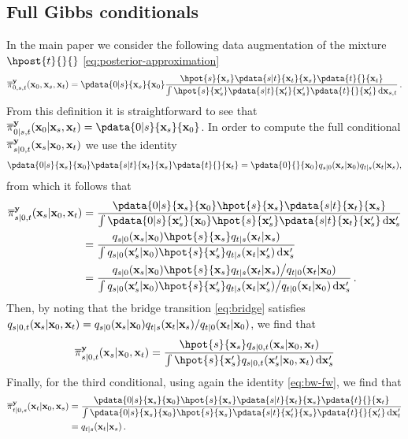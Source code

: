 \subsection{Full Gibbs conditionals}
\label{apdx-sec:conditionals}
In the main paper we consider the following data augmentation of the mixture $\hpost{t}{}{}$ \eqref{eq:posterior-approximation}
\begin{equation}
    \label{eq:extended-distr-normalized}
    \epost{0, s, t}{}{\bx_0, \bx_s, \bx_t} \\ = \pdata{0|s}{\bx_s}{\bx_0} \frac{\hpot{s}{\bx_s} \pdata{s|t}{\bx_t}{\bx_s} \pdata{t}{}{\bx_t}}{\int  \hpot{s}{\bx^\prime _s} \pdata{s|t}{\bx^\prime _t}{\bx^\prime _s} \pdata{t}{}{\bx^\prime _t} \, \rmd \bx_{s, t}}  \eqsp.
\end{equation}
From this definition it is straightforward to see that $\epost{0|s, t}{\bx_s, \bx_t}{\bx_0} = \pdata{0|s}{\bx_s}{\bx_0}$. In order to compute the full conditional $\epost{s|0, t}{\bx_0, \bx_t}{\bx_s}$ we use the identity 
\begin{equation} 
    \label{eq:bw-fw}
    \pdata{0|s}{\bx_s}{\bx_0} \pdata{s|t}{\bx_t}{\bx_s} \pdata{t}{}{\bx_t}= \pdata{0}{}{\bx_0} \fw{s|0}{\bx_0}{\bx_s} \fw{t|s}{\bx_s}{\bx_t},
\end{equation} 
from which it follows that 
\begin{align*} 
    \epost{s|0, t}{\bx_0, \bx_t}{\bx_s} & = \frac{\pdata{0|s}{\bx_s}{\bx_0} \hpot{s}{\bx_s} \pdata{s|t}{\bx_t}{\bx_s}}{\int \pdata{0|s}{\bx^\prime _s}{\bx_0} \hpot{s}{\bx^\prime _s} \pdata{s|t}{\bx_t}{\bx^\prime _s}\, \rmd \bx^\prime _s } \\
    & = \frac{ \fw{s|0}{\bx_0}{\bx_s} \hpot{s}{\bx_s} \fw{t|s}{\bx_s}{\bx_t}}{\int \fw{s|0}{\bx _0}{\bx^\prime _s} \hpot{s}{\bx^\prime _s} \fw{t|s}{\bx^\prime _s}{\bx _t}\, \rmd \bx^\prime _s } \\
    & = \frac{ \fw{s|0}{\bx_0}{\bx_s} \hpot{s}{\bx_s} \fw{t|s}{\bx_s}{\bx_t} \big/ \fw{t|0}{\bx_0}{\bx_t}}{\int \fw{s|0}{\bx _0}{\bx^\prime _s} \hpot{s}{\bx^\prime _s} \fw{t|s}{\bx^\prime _s}{\bx _t} \big/ \fw{t|0}{\bx_0}{\bx_t} \, \rmd \bx^\prime _s } \eqsp.
\end{align*}
Then, by noting that the bridge transition \eqref{eq:bridge} satisfies $\fw{s|0, t}{\bx_0, \bx_t}{\bx_s} = \fw{s|0}{\bx_0}{\bx_s} \fw{t|s}{\bx_s}{\bx_t} / \fw{t|0}{\bx_0}{\bx_t}$, we find that 
$$ 
\epost{s|0, t}{\bx_0, \bx_t}{\bx_s} = \frac{\hpot{s}{\bx_s} \fw{s|0, t}{\bx_0, \bx_t}{\bx_s}}{\int \hpot{s}{\bx^\prime _s} \fw{s|0, t}{\bx_0, \bx_t}{\bx^\prime _s} \, \rmd \bx^\prime _s}
$$
Finally, for the third conditional, using again the identity \eqref{eq:bw-fw}, we find that 
\begin{align*} 
    \epost{t|0, s}{\bx_0, \bx_s}{\bx_t} & = \frac{\pdata{0|s}{\bx_s}{\bx_0} \hpot{s}{\bx_s} \pdata{s|t}{\bx_t}{\bx_s} \pdata{t}{}{\bx_t}}{\int \pdata{0|s}{\bx _s}{\bx_0} \hpot{s}{\bx _s} \pdata{s|t}{\bx^\prime _t}{\bx _s} \pdata{t}{}{\bx^\prime _t}\, \rmd \bx^\prime _t } \\
    & = \fw{t|s}{\bx_s}{\bx_t} \eqsp.
\end{align*}
